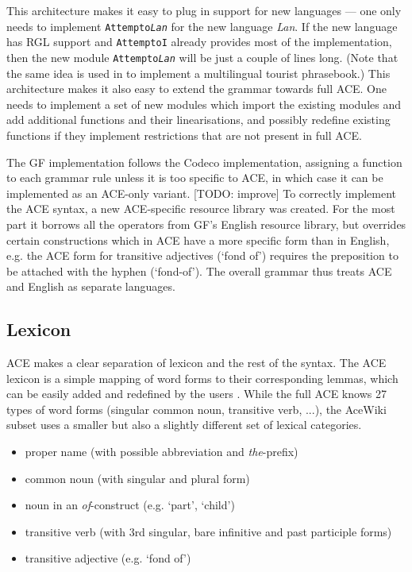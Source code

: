 \documentclass[a4paper]{article}
\begin{document}
This architecture makes it easy to plug in support for new languages ---
one only needs to implement \texttt{Attempto\textit{Lan}} for the new language
\textit{Lan}. If the new language has RGL support and \texttt{AttemptoI}
already provides most of the implementation, then
the new module \texttt{Attempto\textit{Lan}} will be just a couple of lines
long.
(Note that the same idea is used in \cite{ranta:cnl2010_revised} to implement
a multilingual tourist phrasebook.)
This architecture makes it also easy to extend the grammar towards full ACE.
One needs to implement a set of new modules which import the existing modules
and add additional functions and their linearisations, and possibly
redefine existing functions if they implement restrictions that are not
present in full ACE.

The GF implementation follows the Codeco implementation, assigning a function
to each grammar rule unless it is too specific to ACE, in which case it
can be implemented as an ACE-only variant. [TODO: improve]
To correctly implement the ACE syntax, a new ACE-specific resource library
was created. For the most part it borrows all the operators from GF's English
resource library, but overrides certain constructions which in ACE have a
more specific form than in English, e.g. the ACE form for transitive
adjectives (`fond of') requires the preposition to be attached with
the hyphen (`fond-of'). The overall grammar thus treats ACE and English as
separate languages.

\subsection{Lexicon}

ACE makes a clear separation of lexicon and the rest of the syntax. The ACE
lexicon is a simple mapping of word forms to their corresponding lemmas, which
can be easily added and redefined by the users
\cite{ACE_6.6_Lexicon_Specification}. While the full ACE knows 27 types of
word forms (singular common noun, transitive verb, ...), the AceWiki subset
uses a smaller but also a slightly different set of lexical categories.

\begin{itemize}
\item proper name (with possible abbreviation and \emph{the}-prefix)
\item common noun (with singular and plural form)
\item noun in an \emph{of}-construct (e.g. `part', `child')
\item transitive verb (with 3rd singular, bare infinitive and past participle
forms)
\item transitive adjective (e.g. `fond of')
\end{itemize}
\end{document}
